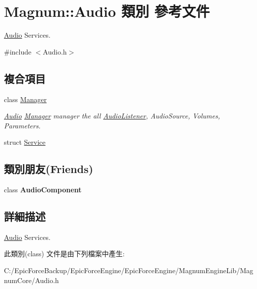 \hypertarget{class_magnum_1_1_audio}{}\section{Magnum\+:\+:Audio 類別 參考文件}
\label{class_magnum_1_1_audio}


\hyperlink{class_magnum_1_1_audio}{Audio} Services.  




{\ttfamily \#include $<$Audio.\+h$>$}

\subsection*{複合項目}
\begin{DoxyCompactItemize}
\item 
class \hyperlink{class_magnum_1_1_audio_1_1_manager}{Manager}
\begin{DoxyCompactList}\small\item\em \hyperlink{class_magnum_1_1_audio}{Audio} \hyperlink{class_magnum_1_1_audio_1_1_manager}{Manager} manager the all \hyperlink{class_magnum_1_1_audio_listener}{Audio\+Listener}, Audio\+Source, Volumes, Parameters. \end{DoxyCompactList}\item 
struct \hyperlink{struct_magnum_1_1_audio_1_1_service}{Service}
\end{DoxyCompactItemize}
\subsection*{類別朋友(Friends)}
\begin{DoxyCompactItemize}
\item 
class {\bfseries Audio\+Component}\hypertarget{class_magnum_1_1_audio_af76924648e1e664d148d0e3951b5a9ce}{}\label{class_magnum_1_1_audio_af76924648e1e664d148d0e3951b5a9ce}

\end{DoxyCompactItemize}


\subsection{詳細描述}
\hyperlink{class_magnum_1_1_audio}{Audio} Services. 

此類別(class) 文件是由下列檔案中產生\+:\begin{DoxyCompactItemize}
\item 
C\+:/\+Epic\+Force\+Backup/\+Epic\+Force\+Engine/\+Epic\+Force\+Engine/\+Magnum\+Engine\+Lib/\+Magnum\+Core/Audio.\+h\end{DoxyCompactItemize}
